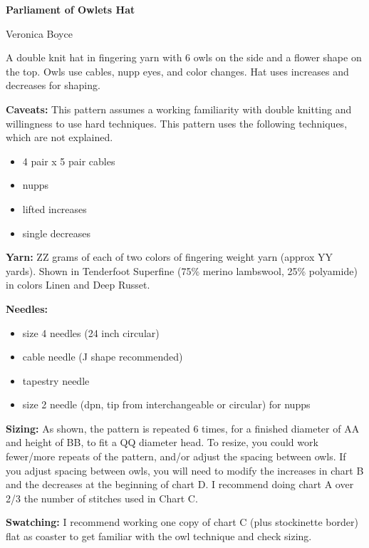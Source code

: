 \documentclass[11pt]{article}
\begin{document}
\begin{centering}
	
\textbf{\LARGE Parliament of Owlets Hat}
\medskip

{\large Veronica Boyce}

\smallskip

\end{centering}


A double knit hat in fingering yarn with 6 owls on the side and a flower shape on the top. Owls use cables, nupp eyes, and color changes. Hat uses increases and decreases for shaping. 
\smallskip

\textbf{Caveats:} This pattern assumes a working familiarity with double knitting and willingness to use hard techniques. This pattern uses the following techniques, which are not explained.
\begin{itemize}
	\item 4 pair x 5 pair cables
	\item nupps
	\item lifted increases
	\item single decreases
\end{itemize}

\smallskip
\textbf{Yarn:} ZZ grams of each of two colors of fingering weight yarn (approx YY yards). Shown in Tenderfoot Superfine (75\% merino lambswool, 25\% polyamide) in colors Linen and Deep Russet. 

\smallskip
\textbf{Needles:} \begin{itemize}
	\item size 4 needles (24 inch circular)
	\item cable needle (J shape recommended)
	\item tapestry needle
	\item size 2 needle (dpn, tip from interchangeable or circular) for nupps
\end{itemize}

\smallskip
\textbf{Sizing:} As shown, the pattern is repeated 6 times, for a finished diameter of AA and height of BB, to fit a QQ diameter head. To resize, you could work fewer/more repeats of the pattern, and/or adjust the spacing between owls. If you adjust spacing between owls, you will need to modify the increases in chart B and the decreases at the beginning of chart D. I recommend doing chart A over 2/3 the number of stitches used in Chart C. 

\smallskip
\textbf{Swatching:} I recommend working one copy of chart C (plus stockinette border) flat as coaster to get familiar with the owl technique and check sizing. 
\end{document}
